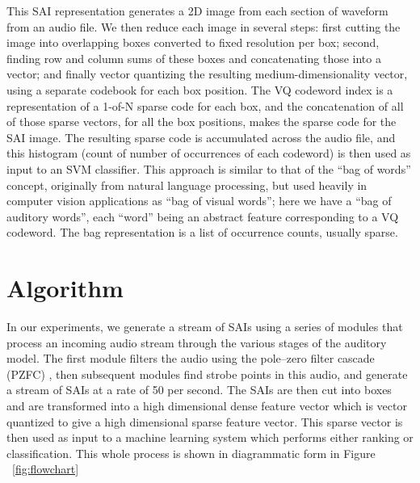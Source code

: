 \documentclass[12pt,oneside]{book}
\begin{document}
This SAI representation generates a 2D image from each section of
waveform from an audio file.  We then reduce each image in several
steps: first cutting the image into overlapping boxes converted to
fixed resolution per box; second, finding row and column sums of these
boxes and concatenating those into a vector; and finally vector
quantizing the resulting medium-dimensionality vector, using a
separate codebook for each box position.  The VQ codeword index is a
representation of a 1-of-N sparse code for each box, and the
concatenation of all of those sparse vectors, for all the box
positions, makes the sparse code for the SAI image.  The resulting
sparse code is accumulated across the audio file, and this histogram
(count of number of occurrences of each codeword) is then used as
input to an SVM \cite{yh05} classifier\cite{chapelle2006}.  This
approach is similar to that of the ``bag of words'' concept,
originally from natural language processing, but used heavily in
computer vision applications as ``bag of visual words''; here we have
a ``bag of auditory words'', each ``word'' being an abstract feature
corresponding to a VQ codeword.  The bag representation is a list of
occurrence counts, usually sparse.


\section{Algorithm}

In our experiments, we generate a stream of SAIs using a series of modules
that process an incoming audio stream through the various stages of the 
auditory model. The first module filters the audio using the
pole--zero filter cascade (PZFC) \cite{lyon10}, then subsequent modules find 
strobe points in this audio, and generate a stream of SAIs at a rate of 50 per 
second. The SAIs are then cut into boxes and are transformed into a high 
dimensional dense feature vector \cite{rehn2009} which is vector quantized to 
give a high dimensional sparse feature vector. This sparse vector is then used 
as input to a machine learning system which performs either ranking or 
classification. This whole process is shown in diagrammatic form in Figure 
~\ref{fig:flowchart}
\end{document}
